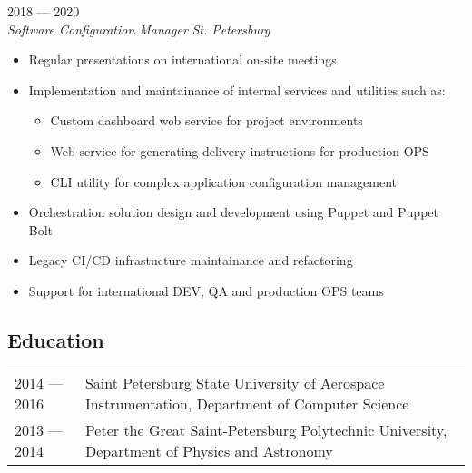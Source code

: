 \documentclass[11pt]{report}
\newenvironment{JobDescription}[4]{
    {\bf #1 } \hfill { #2}
    \\
    {\em #3 } \hfill {\em #4 }
    \begin{itemize}
} {
    \end{itemize}
}
\begin{document}
\begin{JobDescription}{}{2018 --- 2020}{Software Configuration Manager}{St. Petersburg}
    \item Regular presentations on international on-site meetings
    \item Implementation and maintainance of internal services and utilities such as:
    \begin{itemize}
        \item Custom dashboard web service for project environments
        \item Web service for generating delivery instructions for production OPS
        \item CLI utility for complex application configuration management
    \end{itemize}
    \item Orchestration solution design and development using Puppet and Puppet Bolt
    \item Legacy CI/CD infrastucture maintainance and refactoring
    \item Support for international DEV, QA and production OPS teams
\end{JobDescription}

\subsection*{Education}
\begin{table}[H]
    \begin{tabular}{@{}p{}p{}}
        2014 --- 2016 & Saint Petersburg State University of Aerospace Instrumentation, Department of Computer Science \\
        2013 --- 2014 & Peter the Great Saint-Petersburg Polytechnic University, Department of Physics and Astronomy
    \end{tabular}
\end{table}

\goodbreak
\end{document}
